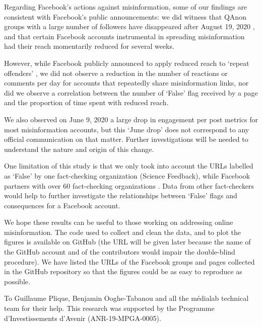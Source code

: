 \documentclass[sigconf]{acmart}
\begin{document}
Regarding Facebook's actions against misinformation, some of our findings are consistent with Facebook's public announcements: we did witness that QAnon groups with a large number of followers have disappeared after August 19, 2020 \cite{FacebookQAnon}, and that certain Facebook accounts instrumental in spreading misinformation had their reach momentarily reduced for several weeks.

However, while Facebook publicly announced to apply reduced reach to `repeat offenders' \cite{FacebookMeasuresAgainstMisinformation}, we did not observe a reduction in the number of reactions or comments per day for accounts that repeatedly share misinformation links, nor did we observe a correlation between the number of `False' flag received by a page and the proportion of time spent with reduced reach.

We also observed on June 9, 2020 a large drop in engagement per post metrics for most misinformation accounts, but this `June drop' does not correspond to any official communication on that matter. Further investigations will be needed to understand the nature and origin of this change.

One limitation of this study is that we only took into account the URLs labelled as `False' by one fact-checking organization (Science Feedback), while Facebook partners with over 60 fact-checking organizations \cite{FacebookPartners}. Data from other fact-checkers would help to further investigate the relationships between `False' flags and consequences for a Facebook account.

We hope these results can be useful to those working on addressing online misinformation. The code used to collect and clean the data, and to plot the figures is available on GitHub (the URL will be given later because the name of the GitHub account and of the contributors would impair the double-blind procedure). We have listed the URLs of the Facebook groups and pages collected in the GitHub repository so that the figures could be as easy to reproduce as possible.

\begin{acks}
To Guillaume Plique, Benjamin Ooghe-Tabanou and all the m\'edialab technical team for their help. This research was supported by the Programme d'Investissements d'Avenir (ANR-19-MPGA-0005).
\end{acks}



\end{document}
